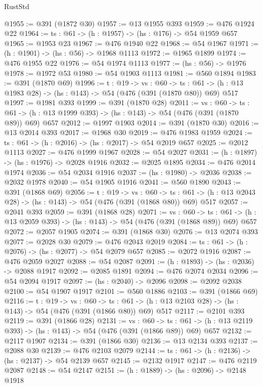 \begin{lexlean}{RustStd}
\begin{coremodule}
@1955 := @391 (@1872 @30)
@1957 := @13 @1955 @393
@1959 := @476 @1924 @22
@1964 := {ts : @61} -> (h : @1957) -> (hs : @176) -> @54 @1959 @657
@1965 := @1953 @23
@1967 := @476 @1940 @22
@1968 := @54 @1967
@1971 := (h : @1901) -> (hs : @56) -> @1968 @1113
@1972 := @1965 @1899
@1974 := @476 @1955 @22
@1976 := @54 @1974 @1113
@1977 := (hs : @56) -> @1976
@1978 := @1972 @53
@1980 := @54 @1903 @1113
@1981 := @560 @1894
@1983 := @391 (@1870 @69)
@1996 := {t : @19} ->
  {vs : @60} ->
  {ts : @61} -> (h : @13 @1983 @28) -> (hs : @143) -> @54 (@476 (@391 (@1870 @80)) @69) @517
@1997 := @1981 @393
@1999 := @391 (@1870 @28)
@2011 := {vs : @60} ->
  {ts : @61} -> (h : @13 @1999 @393) -> (hs : @143) -> @54 (@476 (@391 (@1870 @89)) @69) @657
@2012 := @1997 @1903
@2014 := @391 (@1870 @30)
@2016 := @13 @2014 @393
@2017 := @1968 @30
@2019 := @476 @1983 @1959
@2024 := {ts : @61} -> (h : @2016) -> (hs : @2017) -> @54 @2019 @657
@2025 := @2012 @1113
@2027 := @476 @1999 @1967
@2028 := @54 @2027
@2031 := (h : @1897) -> (hs : @1976) -> @2028 @1916
@2032 := @2025 @1895
@2034 := @476 @2014 @1974
@2036 := @54 @2034 @1916
@2037 := (hs : @1980) -> @2036
@2038 := @2032 @1978
@2040 := @54 @1905 @1916
@2041 := @560 @1890
@2043 := @391 (@1868 @69)
@2056 := {t : @19} ->
  {vs : @60} ->
  {ts : @61} -> (h : @13 @2043 @28) -> (hs : @143) -> @54 (@476 (@391 (@1868 @80)) @69) @517
@2057 := @2041 @393
@2059 := @391 (@1868 @28)
@2071 := {vs : @60} ->
  {ts : @61} -> (h : @13 @2059 @393) -> (hs : @143) -> @54 (@476 (@391 (@1868 @89)) @69) @657
@2072 := @2057 @1905
@2074 := @391 (@1868 @30)
@2076 := @13 @2074 @393
@2077 := @2028 @30
@2079 := @476 @2043 @2019
@2084 := {ts : @61} -> (h : @2076) -> (hs : @2077) -> @54 @2079 @657
@2085 := @2072 @1916
@2087 := @476 @2059 @2027
@2088 := @54 @2087
@2091 := (h : @1893) -> (hs : @2036) -> @2088 @1917
@2092 := @2085 @1891
@2094 := @476 @2074 @2034
@2096 := @54 @2094 @1917
@2097 := (hs : @2040) -> @2096
@2098 := @2092 @2038
@2100 := @54 @1907 @1917
@2101 := @560 @1886
@2103 := @391 (@1866 @69)
@2116 := {t : @19} ->
  {vs : @60} ->
  {ts : @61} -> (h : @13 @2103 @28) -> (hs : @143) -> @54 (@476 (@391 (@1866 @80)) @69) @517
@2117 := @2101 @393
@2119 := @391 (@1866 @28)
@2131 := {vs : @60} ->
  {ts : @61} -> (h : @13 @2119 @393) -> (hs : @143) -> @54 (@476 (@391 (@1866 @89)) @69) @657
@2132 := @2117 @1907
@2134 := @391 (@1866 @30)
@2136 := @13 @2134 @393
@2137 := @2088 @30
@2139 := @476 @2103 @2079
@2144 := {ts : @61} -> (h : @2136) -> (hs : @2137) -> @54 @2139 @657
@2145 := @2132 @1917
@2147 := @476 @2119 @2087
@2148 := @54 @2147
@2151 := (h : @1889) -> (hs : @2096) -> @2148 @1918

\end{coremodule}
\end{lexlean}

